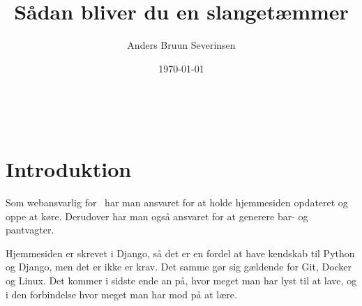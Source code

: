 

\title{Sådan bliver du en slangetæmmer}
\date{\today}
\author{Anders Bruun Severinsen}



\maketitle

\tableofcontents \

\section{Introduktion}

Som webansvarlig for \fredagscafeen\ har man ansvaret for at holde hjemmesiden opdateret og oppe at køre.
Derudover har man også ansvaret for at generere bar- og pantvagter.

Hjemmesiden er skrevet i Django, så det er en fordel at have kendskab til Python og Django, men det er
ikke er krav. Det samme gør sig gældende for Git, Docker og Linux. Det kommer i sidste ende an på, hvor
meget man har lyst til at lave, og i den forbindelse hvor meget man har mod på at lære.












